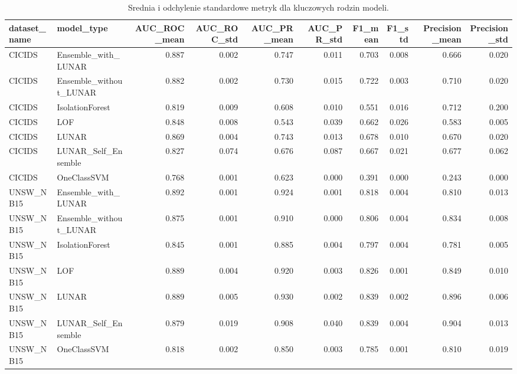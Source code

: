 \begin{table}
\caption{Srednia i odchylenie standardowe metryk dla kluczowych rodzin modeli.}
\label{tab:family_mean_std}
\begin{tabular}{llrrrrrrrr}
\toprule
dataset_name & model_type & AUC_ROC_mean & AUC_ROC_std & AUC_PR_mean & AUC_PR_std & F1_mean & F1_std & Precision_mean & Precision_std \\
\midrule
CICIDS & Ensemble_with_LUNAR & 0.887 & 0.002 & 0.747 & 0.011 & 0.703 & 0.008 & 0.666 & 0.020 \\
CICIDS & Ensemble_without_LUNAR & 0.882 & 0.002 & 0.730 & 0.015 & 0.722 & 0.003 & 0.710 & 0.020 \\
CICIDS & IsolationForest & 0.819 & 0.009 & 0.608 & 0.010 & 0.551 & 0.016 & 0.712 & 0.200 \\
CICIDS & LOF & 0.848 & 0.008 & 0.543 & 0.039 & 0.662 & 0.026 & 0.583 & 0.005 \\
CICIDS & LUNAR & 0.869 & 0.004 & 0.743 & 0.013 & 0.678 & 0.010 & 0.670 & 0.020 \\
CICIDS & LUNAR_Self_Ensemble & 0.827 & 0.074 & 0.676 & 0.087 & 0.667 & 0.021 & 0.677 & 0.062 \\
CICIDS & OneClassSVM & 0.768 & 0.001 & 0.623 & 0.000 & 0.391 & 0.000 & 0.243 & 0.000 \\
UNSW_NB15 & Ensemble_with_LUNAR & 0.892 & 0.001 & 0.924 & 0.001 & 0.818 & 0.004 & 0.810 & 0.013 \\
UNSW_NB15 & Ensemble_without_LUNAR & 0.875 & 0.001 & 0.910 & 0.000 & 0.806 & 0.004 & 0.834 & 0.008 \\
UNSW_NB15 & IsolationForest & 0.845 & 0.001 & 0.885 & 0.004 & 0.797 & 0.004 & 0.781 & 0.005 \\
UNSW_NB15 & LOF & 0.889 & 0.004 & 0.920 & 0.003 & 0.826 & 0.001 & 0.849 & 0.010 \\
UNSW_NB15 & LUNAR & 0.889 & 0.005 & 0.930 & 0.002 & 0.839 & 0.002 & 0.896 & 0.006 \\
UNSW_NB15 & LUNAR_Self_Ensemble & 0.879 & 0.019 & 0.908 & 0.040 & 0.839 & 0.004 & 0.904 & 0.013 \\
UNSW_NB15 & OneClassSVM & 0.818 & 0.002 & 0.850 & 0.003 & 0.785 & 0.001 & 0.810 & 0.019 \\
\bottomrule
\end{tabular}
\end{table}
